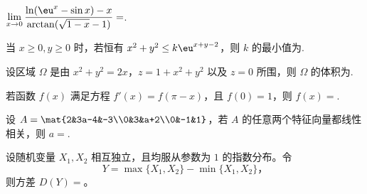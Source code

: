 \begin{question}[index=11]
$\displaystyle\lim_{x\to0}\frac{\ln(\eu^x-\sin x)-x}{\arctan(\sqrt{1-x}-1)}=$\fillin.
\end{question}
\QuestionBreak

\begin{question}[index=12]
当 $x\ge0,y\ge0$ 时，若恒有 $x^2+y^2\le k\eu^{x+y-2}$，则 $k$ 的最小值为\fillin.
\end{question}
\QuestionBreak

\begin{question}[index=13]
设区域 $\Omega$ 是由 $x^2+y^2=2x$，$z=1+x^2+y^2$ 以及 $z=0$ 所围，则 $\Omega$ 的体积为\fillin.
\end{question}
\QuestionBreak

\begin{question}[index=14]
若函数 $f(x)$ 满足方程 $f'(x)=f(\pi-x)$，且 $f(0)=1$，则 $f(x)=$\fillin.
\end{question}
\QuestionBreak

\begin{question}[index=15]
设 $A=\mat{2&3a-4&-3\\0&3&a+2\\0&-1&1}$，若 $A$ 的任意两个特征向量都线性相关，则 $a=$\fillin.
\end{question}
\QuestionBreak

\begin{question}[index=16]
设随机变量 $X_1,X_2$ 相互独立，且均服从参数为 $1$ 的指数分布。令
\[
Y=\max\{X_1,X_2\}-\min\{X_1,X_2\}\text{，}
\]
则方差 $D(Y)=$\fillin。
\end{question}
